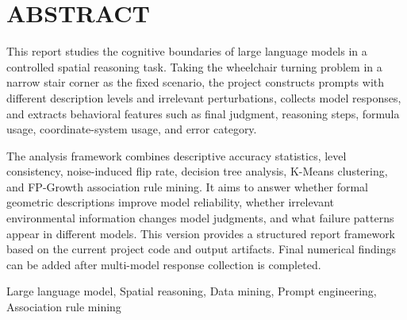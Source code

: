 
\chapter*{\centering \sanhao\bfseries ABSTRACT}

\xiaosi
{}

This report studies the cognitive boundaries of large language models in a controlled spatial reasoning task. Taking the wheelchair turning problem in a narrow stair corner as the fixed scenario, the project constructs prompts with different description levels and irrelevant perturbations, collects model responses, and extracts behavioral features such as final judgment, reasoning steps, formula usage, coordinate-system usage, and error category.

The analysis framework combines descriptive accuracy statistics, level consistency, noise-induced flip rate, decision tree analysis, K-Means clustering, and FP-Growth association rule mining. It aims to answer whether formal geometric descriptions improve model reliability, whether irrelevant environmental information changes model judgments, and what failure patterns appear in different models. This version provides a structured report framework based on the current project code and output artifacts. Final numerical findings can be added after multi-model response collection is completed.

\vspace{0.8cm}

 Large language model, Spatial reasoning, Data mining, Prompt engineering, Association rule mining
